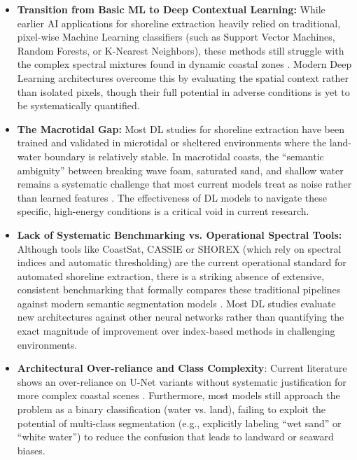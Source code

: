 ﻿\documentclass[ENG]{TFUOC}%
\begin{document}
\begin{itemize}
    \item \textbf{Transition from Basic ML to Deep Contextual Learning:} While earlier AI applications for shoreline extraction heavily relied on traditional, pixel-wise Machine Learning classifiers (such as Support Vector Machines, Random Forests, or K-Nearest Neighbors), these methods still struggle with the complex spectral mixtures found in dynamic coastal zones \citep{tsiakos_use_2023}. Modern Deep Learning architectures overcome this by evaluating the spatial context rather than isolated pixels, though their full potential in adverse conditions is yet to be systematically quantified.
    
    \item \textbf{The Macrotidal Gap:} Most DL studies for shoreline extraction have been trained and validated in microtidal or sheltered environments where the land-water boundary is relatively stable. In macrotidal coasts, the ``semantic ambiguity'' between breaking wave foam, saturated sand, and shallow water remains a systematic challenge that most current models treat as noise rather than learned features \citep{tian_deep_2024}. The effectiveness of DL models to navigate these specific, high-energy conditions is a critical void in current research.

    \item \textbf{Lack of Systematic Benchmarking vs. Operational Spectral Tools:} Although tools like CoastSat, CASSIE or SHOREX (which rely on spectral indices and automatic thresholding) are the current operational standard for automated shoreline extraction, there is a striking absence of extensive, consistent benchmarking that formally compares these traditional pipelines against modern semantic segmentation models \citep{tian_deep_2024}. Most DL studies evaluate new architectures against other neural networks rather than quantifying the exact magnitude of improvement over index-based methods in challenging environments.
    
    \item \textbf{Architectural Over-reliance and Class Complexity}: Current literature shows an over-reliance on U-Net variants without systematic justification for more complex coastal scenes \citep{tian_deep_2024}. Furthermore, most models still approach the problem as a binary classification (water vs. land), failing to exploit the potential of multi-class segmentation (e.g., explicitly labeling ``wet sand'' or ``white water'') to reduce the confusion that leads to landward or seaward biases.

\end{itemize}
\end{document}
